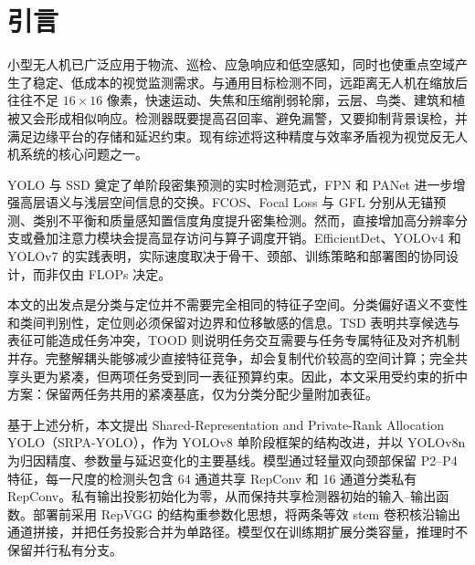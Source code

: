 \section{引言}

小型无人机已广泛应用于物流、巡检、应急响应和低空感知，同时也使重点空域产生了稳定、低成本的视觉监测需求。与通用目标检测不同，远距离无人机在缩放后往往不足 $16\times16$ 像素，快速运动、失焦和压缩削弱轮廓，云层、鸟类、建筑和植被又会形成相似响应。检测器既要提高召回率、避免漏警，又要抑制背景误检，并满足边缘平台的存储和延迟约束。现有综述将这种精度与效率矛盾视为视觉反无人机系统的核心问题之一\cite{yasmeen2025review,wang2021smallobjectsurvey}。

YOLO 与 SSD 奠定了单阶段密集预测的实时检测范式\cite{redmon2016yolo,liu2016ssd}，FPN 和 PANet 进一步增强高层语义与浅层空间信息的交换\cite{lin2017fpn,liu2018panet}。FCOS、Focal Loss 与 GFL 分别从无锚预测、类别不平衡和质量感知置信度角度提升密集检测\cite{tian2019fcos,lin2017focal,li2020gfl}。然而，直接增加高分辨率分支或叠加注意力模块会提高显存访问与算子调度开销。EfficientDet、YOLOv4 和 YOLOv7 的实践表明，实际速度取决于骨干、颈部、训练策略和部署图的协同设计，而非仅由 FLOPs 决定\cite{tan2020efficientdet,bochkovskiy2020yolov4,wang2023yolov7}。

本文的出发点是分类与定位并不需要完全相同的特征子空间。分类偏好语义不变性和类间判别性，定位则必须保留对边界和位移敏感的信息。TSD 表明共享候选与表征可能造成任务冲突\cite{wu2020tsd}，TOOD 则说明任务交互需要与任务专属特征及对齐机制并存\cite{feng2021tood}。完整解耦头能够减少直接特征竞争，却会复制代价较高的空间计算；完全共享头更为紧凑，但两项任务受到同一表征预算约束。因此，本文采用受约束的折中方案：保留两任务共用的紧凑基底，仅为分类分配少量附加表征。

基于上述分析，本文提出 Shared-Representation and Private-Rank Allocation YOLO（SRPA-YOLO），作为 YOLOv8 单阶段框架的结构改进，并以 YOLOv8n 为归因精度、参数量与延迟变化的主要基线。模型通过轻量双向颈部保留 P2--P4 特征，每一尺度的检测头包含 64 通道共享 RepConv 和 16 通道分类私有 RepConv。私有输出投影初始化为零，从而保持共享检测器初始的输入--输出函数。部署前采用 RepVGG 的结构重参数化思想\cite{ding2021repvgg}，将两条等效 stem 卷积核沿输出通道拼接，并把任务投影合并为单路径。模型仅在训练期扩展分类容量，推理时不保留并行私有分支。

